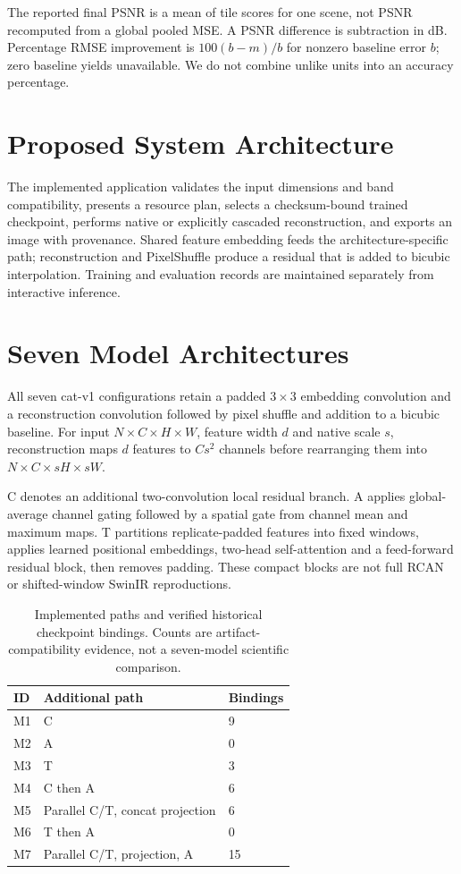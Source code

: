 \documentclass[conference]{IEEEtran}
\begin{document}
The reported final PSNR is a mean of tile scores for one scene, not PSNR recomputed from a global pooled MSE. A PSNR difference is subtraction in dB. Percentage RMSE improvement is $100(b-m)/b$ for nonzero baseline error $b$; zero baseline yields unavailable. We do not combine unlike units into an accuracy percentage.


\section{Proposed System Architecture}
The implemented application validates the input dimensions and band compatibility, presents a resource plan, selects a checksum-bound trained checkpoint, performs native or explicitly cascaded reconstruction, and exports an image with provenance. Shared feature embedding feeds the architecture-specific path; reconstruction and PixelShuffle produce a residual that is added to bicubic interpolation. Training and evaluation records are maintained separately from interactive inference.
\section{Seven Model Architectures}
All seven cat-v1 configurations retain a padded $3\times3$ embedding convolution and a reconstruction convolution followed by pixel shuffle and addition to a bicubic baseline. For input $N\times C\times H\times W$, feature width $d$ and native scale $s$, reconstruction maps $d$ features to $Cs^2$ channels before rearranging them into $N\times C\times sH\times sW$.

C denotes an additional two-convolution local residual branch. A applies global-average channel gating followed by a spatial gate from channel mean and maximum maps. T partitions replicate-padded features into fixed windows, applies learned positional embeddings, two-head self-attention and a feed-forward residual block, then removes padding. These compact blocks are not full RCAN or shifted-window SwinIR reproductions.

\begin{table}[t]
\centering\small
\caption{Implemented paths and verified historical checkpoint bindings. Counts are artifact-compatibility evidence, not a seven-model scientific comparison.}
\begin{tabular}{lll}\toprule
ID & Additional path & Bindings\\\midrule
M1 & C &9\\ M2 & A &0\\ M3 & T &3\\
M4 & C then A &6\\ M5 & Parallel C/T, concat projection &6\\
M6 & T then A &0\\ M7 & Parallel C/T, projection, A &15\\\bottomrule
\end{tabular}
\end{table}
\end{document}
